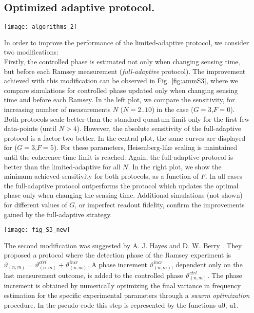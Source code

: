 \subsection{Optimized adaptive protocol. }
\begin{figure*}[h!]
	\centering
	\texttt{[image: algorithms\_2]}
	\caption{\label{fig:ammA2} \textbf{Pseudo-code for the optimized adaptive protocol.}}
\end{figure*}
In order to improve the performance of the limited-adaptive protocol, we consider two modifications:\\

Firstly, the controlled phase is estimated not only when changing sensing time, but before each Ramsey measurement (\textit{full-adaptive} protocol). The improvement achieved with this modification can be observed in Fig. \ref{fig:ammS3}, where we compare simulations for controlled phase updated only when changing sensing time and before each Ramsey. In the left plot, we compare the sensitivity, for increasing number of measurements $N$ ($N=2..10$) in the case ($G=3$,$F=0$). Both protocols scale better than the standard quantum limit only for the first few data-points (until $N>4$). However, the absolute sensitivity of the full-adaptive protocol is a factor two better. In the central plot, the same curves are displayed for ($G=3$,$F=5$). For these parameters, Heisenberg-like scaling is maintained until the coherence time limit is reached. Again, the full-adaptive protocol is better than the limited-adaptive for all $N$. In the right plot, we show the minimum achieved sensitivity for both protocols, as a function of $F$. In all cases the full-adaptive protocol outperforms the protocol which updates the optimal phase only when changing the sensing time. Additional simulations (not shown) for different values of $G$, or imperfect readout fidelity, confirm the improvements gained by the full-adaptive strategy. \\
\begin{figure*}
	\centering
	\texttt{[image: fig\_S3\_new]}
	\caption{\label{fig:ammS3} \textbf{Comparison adaptive protocols} Adaptive protocols: simulation results comparing sensitivities obtained when updating the controlled phase only when changing sensing time (blue) and updating it before each Ramsey (red). We assume perfect readout fidelity and $T_2^* = 5\mu$s. Shaded areas represent error bars corresponding to one standard deviation (bootstrap method). 
	}
\end{figure*}
The second modification was suggested by A. J. Hayes and D. W. Berry \cite{Hayes_Phys.Rev.A_2014}. They proposed a protocol where the detection phase of the Ramsey experiment is $\vartheta_{(n,m)} = \vartheta_{(n,m)}^{ctrl} + \vartheta_{(n,m)}^{incr}$. A phase increment $\vartheta_{(n,m)}^{incr}$, dependent only on the last measurement outcome, is added to the controlled phase $\vartheta_{(n,m)}^{ctrl}$. The phase increment is obtained by numerically optimizing the final variance in frequency estimation for the specific experimental parameters through a \textit{swarm optimization} procedure\cite{Hayes_Phys.Rev.A_2014,Hentschel_Phys.Rev.Lett._2010,Bratton__2007}. In the pseudo-code this step is represented by the functions u0, u1. \\

